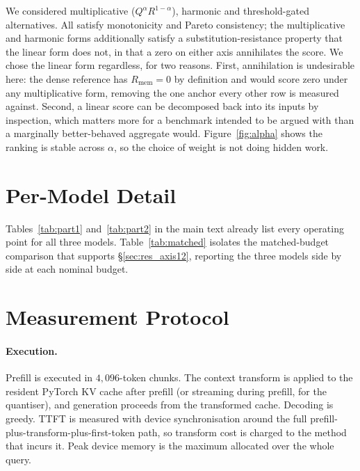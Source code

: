 \documentclass{article}
\theoremstyle{definition}
\newcommand{\beff}{b_{\text{eff}}}
\begin{document}
We considered multiplicative ($Q^{\alpha} R^{1-\alpha}$), harmonic and threshold-gated alternatives. All satisfy monotonicity and Pareto consistency; the multiplicative and harmonic forms additionally satisfy a substitution-resistance property that the linear form does not, in that a zero on either axis annihilates the score. We chose the linear form regardless, for two reasons. First, annihilation is undesirable here: the dense reference has $R_{\text{mem}} = 0$ by definition and would score zero under any multiplicative form, removing the one anchor every other row is measured against. Second, a linear score can be decomposed back into its inputs by inspection, which matters more for a benchmark intended to be argued with than a marginally better-behaved aggregate would. Figure~\ref{fig:alpha} shows the ranking is stable across $\alpha$, so the choice of weight is not doing hidden work.

\section{Per-Model Detail}
\label{app:permodel}

Tables~\ref{tab:part1} and~\ref{tab:part2} in the main text already list every operating point for all three models. Table~\ref{tab:matched} isolates the matched-budget comparison that supports \S\ref{sec:res_axis12}, reporting the three models side by side at each nominal budget.

\begin{table}[h]
\centering
\small
\setlength{\tabcolsep}{5.5pt}
\caption{\textbf{Matched nominal budget across models.} Accuracy per model at each controlled budget, with the mean realised $\beff$, mean TTFT inflation against the paired dense run, and mean hardware multiplier. Within a block every method holds the same nominal budget, so accuracy differences are attributable to how the budget is spent.}
\label{tab:matched}

\end{table}

\section{Measurement Protocol}
\label{app:protocol}

\paragraph{Execution.} Prefill is executed in $4{,}096$-token chunks. The context transform is applied to the resident PyTorch KV cache after prefill (or streaming during prefill, for the quantiser), and generation proceeds from the transformed cache. Decoding is greedy. TTFT is measured with device synchronisation around the full prefill-plus-transform-plus-first-token path, so transform cost is charged to the method that incurs it. Peak device memory is the maximum allocated over the whole query.
\end{document}
